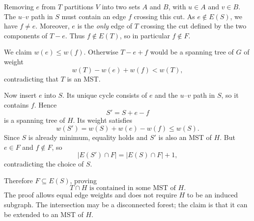 \documentclass[11pt]{article}
\begin{document}
Removing $e$ from $T$ partitions $V$ into two sets $A$ and $B$, with
$u\in A$ and $v\in B$. The $u$--$v$ path in $S$ must contain an edge
$f$ crossing this cut. As $e\notin E(S)$, we have $f\ne e$.
Moreover, $e$ is the \emph{only} edge of $T$ crossing the cut defined
by the two components of $T-e$. Thus $f\notin E(T)$, so in particular
$f\notin F$.

We claim $w(e)\le w(f)$. Otherwise $T-e+f$ would be a spanning tree of
$G$ of weight
\[
  w(T)-w(e)+w(f)<w(T),
\]
contradicting that $T$ is an MST.

Now insert $e$ into $S$. Its unique cycle consists of $e$ and the
$u$--$v$ path in $S$, so it contains $f$. Hence
\[
  S'=S+e-f
\]
is a spanning tree of $H$. Its weight satisfies
\[
  w(S')=w(S)+w(e)-w(f)\le w(S).
\]
Since $S$ is already minimum, equality holds and $S'$ is also an MST
of $H$. But $e\in F$ and $f\notin F$, so
\[
  |E(S')\cap F|=|E(S)\cap F|+1,
\]
contradicting the choice of $S$.

Therefore $F\subseteq E(S)$, proving
\[
  \boxed{T\cap H\text{ is contained in some MST of }H.}
\]
The proof allows equal edge weights and does not require $H$ to be
an induced subgraph. The intersection may be a disconnected forest;
the claim is that it can be extended to an MST of $H$.
\end{document}
